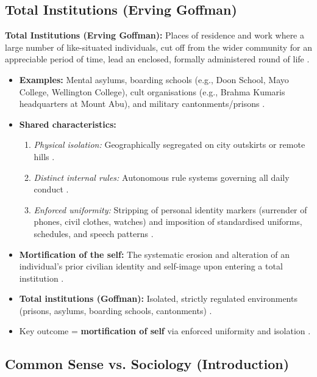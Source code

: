 \subsection{Total Institutions (Erving Goffman)}

\begin{KeyConcept}
\textbf{Total Institutions (Erving Goffman):} Places of residence and work where a large number of like-situated individuals, cut off from the wider community for an appreciable period of time, lead an enclosed, formally administered round of life .
\begin{itemize}
    \item \textbf{Examples:} Mental asylums, boarding schools (e.g., Doon School, Mayo College, Wellington College), cult organisations (e.g., Brahma Kumaris headquarters at Mount Abu), and military cantonments/prisons .
    \item \textbf{Shared characteristics:}
    \begin{enumerate}
        \item \textit{Physical isolation:} Geographically segregated on city outskirts or remote hills .
        \item \textit{Distinct internal rules:} Autonomous rule systems governing all daily conduct .
        \item \textit{Enforced uniformity:} Stripping of personal identity markers (surrender of phones, civil clothes, watches) and imposition of standardised uniforms, schedules, and speech patterns .
    \end{enumerate}
    \item \textbf{Mortification of the self:} The systematic erosion and alteration of an individual's prior civilian identity and self-image upon entering a total institution .
\end{itemize}
\end{KeyConcept}

\begin{QuickRevision}
\begin{itemize}
    \item \textbf{Total institutions (Goffman):} Isolated, strictly regulated environments (prisons, asylums, boarding schools, cantonments) .
    \item Key outcome = \textbf{mortification of self} via enforced uniformity and isolation .
\end{itemize}
\end{QuickRevision}

\subsection{Common Sense vs. Sociology (Introduction)}

